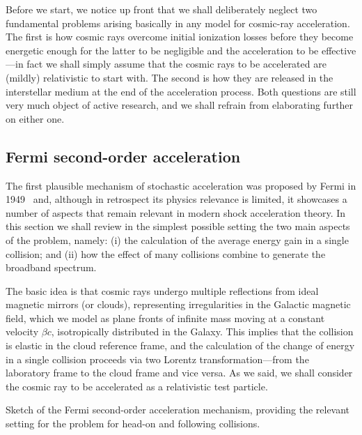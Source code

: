 Before we start, we notice up front that we shall deliberately neglect two fundamental
problems arising basically in any model for cosmic-ray acceleration. The first is
how cosmic rays overcome initial ionization losses before they become energetic
enough for the latter to be negligible and the acceleration to be effective---in
fact we shall simply assume that the cosmic rays to be accelerated are (mildly)
relativistic to start with. The second is how they are released in the interstellar
medium at the end of the acceleration process. Both questions are still very much
object of active research, and we shall refrain from elaborating further on either one.



\subsection{Fermi second-order acceleration}

The first plausible mechanism of stochastic acceleration was proposed by Fermi in
1949~\cite{1949PhRv...75.1169F} and, although in retrospect its physics relevance
is limited, it showcases a number of aspects that remain relevant in modern shock
acceleration theory. In this section we shall review in the simplest possible setting
the two main aspects of the problem, namely: (i) the calculation of the average
energy gain in a single collision; and (ii) how the effect of many collisions combine
to generate the broadband spectrum.

The basic idea is that cosmic rays undergo multiple reflections from ideal magnetic
mirrors (or clouds),
representing irregularities in the Galactic magnetic field, which we model as plane
fronts of infinite mass moving at a constant velocity $\beta c$, isotropically
distributed in the Galaxy. This implies that the collision is elastic in the cloud
reference frame, and the calculation of the change of energy in a single collision
proceeds via two Lorentz transformation---from the laboratory frame to the cloud
frame and vice versa. As we said, we shall consider the cosmic ray to be accelerated
as a relativistic test particle.

\begin{marginfigure}
  
  
  \caption{Sketch of the Fermi second-order acceleration mechanism, providing the
  relevant setting for the problem for head-on and following collisions.}
  \label{fig:fermi_accel}
\end{marginfigure}

